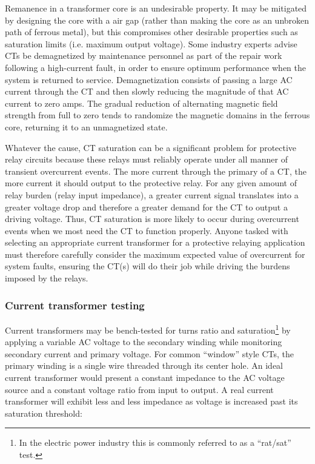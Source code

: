 Remanence in a transformer core is an undesirable property.  It may be mitigated by designing the core with a air gap (rather than making the core as an unbroken path of ferrous metal), but this compromises other desirable properties such as saturation limits (i.e. maximum output voltage).  Some industry experts advise CTs be demagnetized by maintenance personnel as part of the repair work following a high-current fault, in order to ensure optimum performance when the system is returned to service.  Demagnetization consists of passing a large AC current through the CT and then slowly reducing the magnitude of that AC current to zero amps.  The gradual reduction of alternating magnetic field strength from full to zero tends to randomize the magnetic domains in the ferrous core, returning it to an unmagnetized state.

\vskip 10pt

Whatever the cause, CT saturation can be a significant problem for protective relay circuits because these relays must reliably operate under all manner of transient overcurrent events.  The more current through the primary of a CT, the more current it should output to the protective relay.  For any given amount of relay burden (relay input impedance), a greater current signal translates into a greater voltage drop and therefore a greater demand for the CT to output a driving voltage.  Thus, CT saturation is more likely to occur during overcurrent events when we most need the CT to function properly.  Anyone tasked with selecting an appropriate current transformer for a protective relaying application must therefore carefully consider the maximum expected value of overcurrent for system faults, ensuring the CT(s) will do their job while driving the burdens imposed by the relays.










\filbreak
\subsubsection{Current transformer testing}

Current transformers may be bench-tested for turns ratio and saturation\footnote{In the electric power industry this is commonly referred to as a ``rat/sat'' test.} by applying a variable AC voltage to the secondary winding while monitoring secondary current and primary voltage.  For common ``window'' style CTs, the primary winding is a single wire threaded through its center hole.  An ideal current transformer would present a constant impedance to the AC voltage source and a constant voltage ratio from input to output.  A real current transformer will exhibit less and less impedance as voltage is increased past its saturation threshold:

